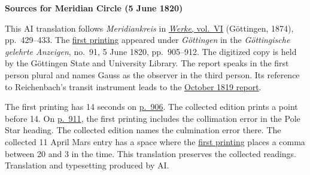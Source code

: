 \clearpage\thispagestyle{empty}
\begin{center}\textbf{Sources for Meridian Circle (5 June 1820)}\end{center}
\noindent This AI translation follows \textit{Meridiankreis} in \href{https://gdz.sub.uni-goettingen.de/id/PPN236007467}{\textit{Werke}, vol.~VI} (Göttingen, 1874), pp.~429--433. The \href{https://images.p.sub.uni-goettingen.de/iiif/image/gdz:PPN319721507_1820:00000901/full/1600,/0/default.jpg}{first printing} appeared under \textit{Göttingen} in the \textit{Göttingische gelehrte Anzeigen}, no.~91, 5 June 1820, pp.~905--912. The digitized copy is held by the Göttingen State and University Library. The report speaks in the first person plural and names Gauss as the observer in the third person. Its reference to Reichenbach’s transit instrument leads to the \hyperlink{native-427-part-lower}{October 1819 report}.
\par\smallskip\noindent The first printing has 14 seconds on \href{https://images.p.sub.uni-goettingen.de/iiif/image/gdz:PPN319721507_1820:00000902/full/1600,/0/default.jpg}{p.~906}. The collected edition prints a point before 14. On \href{https://images.p.sub.uni-goettingen.de/iiif/image/gdz:PPN319721507_1820:00000907/full/1600,/0/default.jpg}{p.~911}, the first printing includes the collimation error in the Pole Star heading. The collected edition names the culmination error there. The collected 11 April Mars entry has a space where the \href{https://images.p.sub.uni-goettingen.de/iiif/image/gdz:PPN319721507_1820:00000908/full/1600,/0/default.jpg}{first printing} places a comma between 20 and 3 in the time. This translation preserves the collected readings. Translation and typesetting produced by AI.
\clearpage
